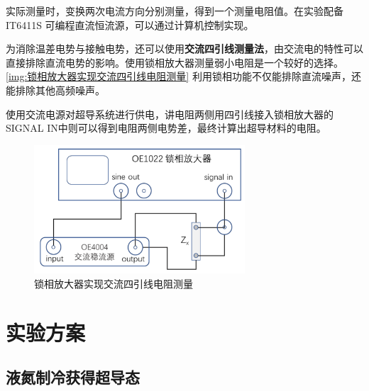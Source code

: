 \documentclass{spaexp}
\begin{document}
            实际测量时，变换两次电流方向分别测量，得到一个测量电阻值。在实验配备 IT6411S 可编程直流恒流源，可以通过计算机控制实现。\par

            为消除温差电势与接触电势，还可以使用{\bf{交流四引线测量法}}，由交流电的特性可以直接排除直流电势的影响。使用锁相放大器测量弱小电阻是一个较好的选择。\autoref{img:锁相放大器实现交流四引线电阻测量}
            利用锁相功能不仅能排除直流噪声，还能排除其他高频噪声。\par

            使用交流电源对超导系统进行供电，讲电阻两侧用四引线接入锁相放大器的SIGNAL IN中则可以得到电阻两侧电势差，最终计算出超导材料的电阻。
            \begin{figure}
                \ct
                \caption{锁相放大器实现交流四引线电阻测量}
                \label{img:锁相放大器实现交流四引线电阻测量}
                \includegraphics[width = 0.7\textwidth]{dcfourfoot.png}
            \end{figure}

            
    
    \section{实验方案}
        \subsection{液氮制冷获得超导态}
\end{document}
